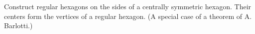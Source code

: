 Construct regular hexagons on the sides of a centrally symmetric hexagon. Their centers form the vertices of a regular hexagon. (A special case of a theorem of A. Barlotti.)
